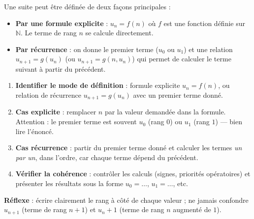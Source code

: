 \documentclass[11pt]{article}
\begin{document}
\begin{propriete}
Une suite peut être définée de deux façons principales :
\begin{itemize}
\item \textbf{Par une formule explicite} : $u_n = f(n)$ où $f$ est une fonction définie sur $\mathbb{N}$. Le terme de rang $n$ se calcule directement.
\item \textbf{Par récurrence} : on donne le premier terme ($u_0$ ou $u_1$) et une relation $u_{n+1} = g(u_n)$ (ou $u_{n+1} = g(n, u_n)$) qui permet de calculer le terme suivant à partir du précédent.
\end{itemize}
\end{propriete}

\begin{methode}
\begin{enumerate}
\item \textbf{Identifier le mode de définition} : formule explicite $u_n=f(n)$, ou relation de récurrence $u_{n+1}=g(u_n)$ avec un premier terme donné.
\item \textbf{Cas explicite} : remplacer $n$ par la valeur demandée dans la formule. Attention : le premier terme est souvent $u_0$ (rang $0$) ou $u_1$ (rang $1$) — bien lire l'énoncé.
\item \textbf{Cas récurrence} : partir du premier terme donné et calculer les termes \emph{un par un}, dans l'ordre, car chaque terme dépend du précédent.
\item \textbf{Vérifier la cohérence} : contrôler les calculs (signes, priorités opératoires) et présenter les résultats sous la forme $u_0=\ldots$, $u_1=\ldots$, etc.
\end{enumerate}
\textbf{Réflexe} : écrire clairement le rang à côté de chaque valeur ; ne jamais confondre $u_{n+1}$ (terme de rang $n+1$) et $u_n+1$ (terme de rang $n$ augmenté de $1$).
\end{methode}
\end{document}
